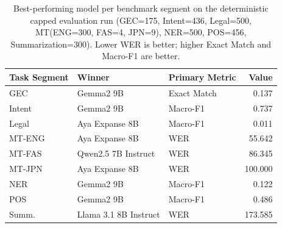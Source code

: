 \begin{table}[t]
\centering
\caption{Best-performing model per benchmark segment on the deterministic capped evaluation run (GEC=175, Intent=436, Legal=500, MT(ENG=300, FAS=4, JPN=9), NER=500, POS=456, Summarization=300). Lower WER is better; higher Exact Match and Macro-F1 are better.}
\label{tab:capped-task-winners}
\begin{tabular}{lllr}
\toprule
Task Segment & Winner & Primary Metric & Value \\
\midrule
GEC & Gemma2 9B & Exact Match & 0.137 \\
Intent & Gemma2 9B & Macro-F1 & 0.737 \\
Legal & Aya Expanse 8B & Macro-F1 & 0.011 \\
MT-ENG & Aya Expanse 8B & WER & 55.642 \\
MT-FAS & Qwen2.5 7B Instruct & WER & 86.345 \\
MT-JPN & Aya Expanse 8B & WER & 100.000 \\
NER & Gemma2 9B & Macro-F1 & 0.122 \\
POS & Gemma2 9B & Macro-F1 & 0.486 \\
Summ. & Llama 3.1 8B Instruct & WER & 173.585 \\
\bottomrule
\end{tabular}
\end{table}
